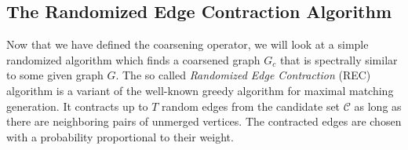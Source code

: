 \subsection{The Randomized Edge Contraction Algorithm}%
\label{sec:coarse:rec}

Now that we have defined the coarsening operator, we will look at a simple randomized algorithm which finds a coarsened graph $G_c$ that is spectrally similar to some given graph $G$.
The so called \textit{Randomized Edge Contraction} (REC) algorithm is a variant of the well-known greedy algorithm for maximal matching generation.
It contracts up to $T$ random edges from the candidate set $\mathcal{C}$ as long as there are neighboring pairs of unmerged vertices.
The contracted edges are chosen with a probability proportional to their weight.
\begin{figure}[H]
	\setlength{\intextsep}{0pt}
	\begin{minipage}{0.6\linewidth}
		\begin{algorithm}[H]
			\caption{Randomized Edge Contraction}\label{algo:coarse:rec}
			\begin{algorithmic}[1]
					\EndWhile{}
				\EndFunction{}
			\end{algorithmic}
		\end{algorithm}
	\end{minipage}%
	\begin{minipage}{0.4\linewidth}
		\begin{figure}[H]
			\centering

\end{figure}
\end{minipage}
\end{figure}
